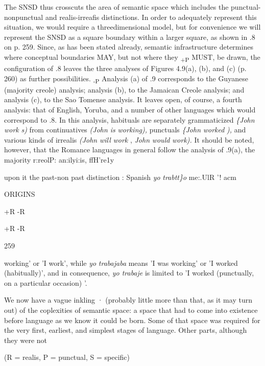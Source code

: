 The SNSD thus crosscuts the area of semantic space which includes the punctual-nonpunctual and realis-irreafis distinctions. In order to adequately represent this situation, we would require a three\-dimensional model, but for convenience we will represent the SNSD as a square boundary within a larger square, as shown in .8 on
p. 259. Since, as has been stated already, semantic infrastructure
determines where conceptual boundaries MAY, but not where they \textsubscript{+P }MUST, be drawn, the configuration of .8 leaves the three
analyses of Figures 4.9(a), (b), and (c) (p. 260) as further possibilities. \textsubscript{{}-}\textsubscript{P}
Analysis (a) of .9 corresponds to the Guyanese (majority creole) analysis; analysis (b), to the Jamaican Creole analysis; and analysis (c), to the Sao Tomense analysis. It leaves open, of course, a fourth analysis: that of English, Yoruba, and a number of other languages which would correspond to .8. In this analysis, habituals are separately grammaticized \textit{\{John} \textit{work} \textit{s)} from continua\-tives \textit{(John is} \textit{workin}\textit{g}\textit{), }punctuals \textit{\{John} \textit{worked} \textit{), }and various kinds of irrealis \textit{(John} \textit{will} \textit{work} , \textit{John} \textit{would} \textit{wor}\textit{k}\textit{).} It should be noted, however, that the Romance languages in general follow the analysis of .9(a), the majority r:reolP: an:ilyi:is, ffH're1y   

upon it the past-non past distinction : Spanish \textit{yo }\textit{trabtt\}o }me:.UlR '! acm

ORIGINS

+R -R 

+R -R

259

working' or 'I work', while \textit{yo} \textit{trabajaba} means 'I was working' or 'I worked (habitually)', and in consequence, \textit{yo trabaje} is limited to 'I worked (punctually, on a particular occasion) '.

We now have a vague inkling · (probably little more than that, as it may turn out) of the coplexities of semantic space: a space that had to come into existence before language as we know it could be born. Some of that space was required for the very first, earliest, and simplest stages of language. Other parts, although they were not

(R = realis, P = punctual, S = specific)

